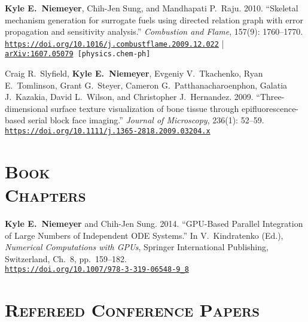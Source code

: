\documentclass[margin,line,11pt]{res}
\makeatletter
\newlength{\bibhang}
\newlength{\bibsep}
 {\@listi \global\bibsep\itemsep \global\advance\bibsep by\parsep}
\newenvironment{bibenum*}
  {\renewcommand\labelenumi{\theenumi.}%
   \etaremune[
     topsep=0pt,
     itemsep=\bibsep,
     parsep=0pt,partopsep=0pt,
     itemindent=-\bibhang,
     leftmargin={\bibhang+\widthof{[999]}}]}
  {\endetaremune}
\newcommand*{\doi}[1]{\href{https://doi.org/#1}{\nolinkurl{https://doi.org/#1}}}
\makeatother
\begin{document}
\begin{resume}
\begin{bibenum*}
\item \textbf{Kyle E.~Niemeyer}, Chih-Jen Sung, and Mandhapati P.\ Raju.
2010.
``Skeletal mechanism generation for surrogate fuels using directed relation graph with error propagation and sensitivity analysis.''
\emph{Combustion and Flame}, 157(9): 1760--1770. \\
\doi{10.1016/j.combustflame.2009.12.022} | \\
{\tt \href{https://arxiv.org/abs/1607.05079}{arXiv:1607.05079} [physics.chem-ph]}

\item Craig R.\ Slyfield, \textbf{Kyle E.~Niemeyer}, Evgeniy V.\ Tkachenko, Ryan E.\ Tomlinson, Grant G.\ Steyer, Cameron G.\ \mbox{Patthanacharoenphon}, Galatia J.\ Kazakia, David L.\ Wilson, and Christopher J.\ Hernandez.
2009.
``Three-dimensional surface texture visualization of bone tissue through epifluorescence-based serial block face imaging.''
\emph{Journal of Microscopy}, 236(1): 52--59.
\doi{10.1111/j.1365-2818.2009.03204.x}

\end{bibenum*}

\section{\textsc{Book\\Chapters}}

\begin{bibenum*}

\item \textbf{Kyle E.~Niemeyer} and Chih-Jen Sung.
2014.
``GPU-Based Parallel Integration of Large Numbers of Independent ODE Systems.''
In V.\ Kindratenko (Ed.), \emph{Numerical Computations with GPUs}, Springer International Publishing, Switzerland, Ch.\ 8, pp.\ 159--182. \\
\doi{10.1007/978-3-319-06548-9_8}

\end{bibenum*}

\section{\textsc{Refereed Conference Papers}}

\begin{bibenum*}


\end{bibenum*}
\end{resume}
\end{document}
